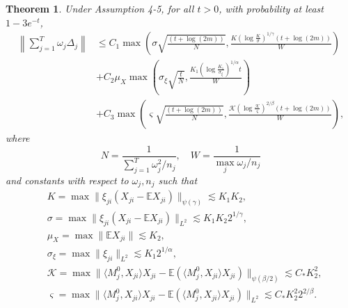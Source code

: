 \documentclass[12pt]{article}
\newtheorem{thm}{Theorem}
\begin{document}
  \begin{thm}
  \label{lem_lambda_indpdt_full}
    Under Assumption 4-5, for all $t>0$, with probability at least $1-3e^{-t}$, 
    \begin{equation*}
    \begin{aligned}
    \left\|\sum_{j=1}^T \omega_j\Delta_j \right\| & \le C_1\max\left(\sigma \sqrt{\frac{(t+\log(2m))}{N}},\frac{K\left(\log \frac{K}{\sigma}\right)^{1/\gamma}(t + \log(2m))}{W}\right) \\&+ C_2\mu_X \max\left(\sigma_\xi \sqrt{\frac{t}{N}},\frac{K_1 (\log \frac{K_1}{\sigma_\xi})^{1/\alpha}t}{W}
    \right) \\&+ C_3\max\left(\varsigma \sqrt{\frac{(t+\log(2m))}{N}},\frac{\mathcal{K}\left(\log \frac{\mathcal{K}}{\varsigma}\right)^{2/\beta}(t + \log(2m))}{W}\right),
    \end{aligned}
    \end{equation*}
    where $$N=\frac{1}{\sum_{j=1}^T \omega_j^2/n_j},\quad W  =\frac{1}{\max_{j} \omega_j/n_j}$$
    and constants with respect to $\omega_j, n_j$ such that
    \begin{equation*}
    \begin{aligned}
    & K=  \max \| \xi_{ji} (X_{ji} - \mathbb{E}X_{ji})\|_{\psi(\gamma)} \lesssim K_1K_2,\\
    & \sigma= \max \| \xi_{ji} (X_{ji} - \mathbb{E}X_{ji})\|_{L^{2}}\lesssim K_1K_2 2^{1/\gamma},\\
    & \mu_X = \max \|\mathbb{E} X_{ji}\| \lesssim K_2,\\
    &\sigma_\xi = \max\|\xi_{ji}\|_{L^2} \lesssim K_1 2^{1/\alpha},\\
    & \mathcal{K}=\max \| \langle M_j^0, X_{ji}\rangle X_{ji} - \mathbb{E}(\langle M^0_j, X_{ji}\rangle X_{ji})\|_{\psi(\beta/2)} \lesssim C_* K_2^2,\\
    & \varsigma = \max\|\langle M_j^0, X_{ji}\rangle X_{ji} - \mathbb{E}(\langle M^0_j, X_{ji}\rangle X_{ji})\|_{L^2} \lesssim C_* K_2^2 2^{2/\beta}.
    \end{aligned}
    \end{equation*}
  \end{thm}
\end{document}
